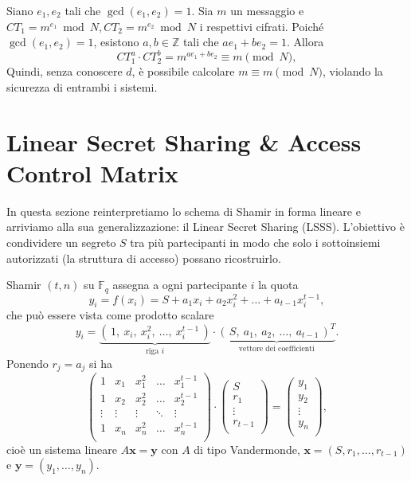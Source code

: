 \documentclass[a4paper, 11pt]{article}
\begin{document}
Siano $e_1,e_2$ tali che $\gcd(e_1,e_2)=1$. Sia $m$ un messaggio e $CT_1 = m^{e_1}\bmod N,CT_2 = m^{e_2}\bmod N$ i respettivi cifrati. Poiché $\gcd(e_1,e_2)=1$, esistono $a,b\in\mathbb{Z}$ tali che $ae_1 + be_2 = 1$. Allora
\[
    CT_1^a \cdot CT_2^b = m^{ae_1 + be_2} \equiv m \pmod N,
\] 
Quindi, senza conoscere $d$, è possibile calcolare $m \equiv m \pmod N$, violando la sicurezza di entrambi i sistemi.

\newpage

\section{Linear Secret Sharing \& Access Control Matrix}

In questa sezione reinterpretiamo lo schema di Shamir in forma lineare e arriviamo alla sua generalizzazione: il Linear Secret Sharing (LSSS). L'obiettivo è condividere un segreto $S$ tra più partecipanti in modo che solo i sottoinsiemi autorizzati (la struttura di accesso) possano ricostruirlo.

Shamir $(t,n)$ su $\mathbb{F}_q$ assegna a ogni partecipante $i$ la quota
\[
    y_i=f(x_i)=S + a_1 x_i + a_2 x_i^2 + \dots + a_{t-1} x_i^{t-1},
\]
che può essere vista come prodotto scalare
\[
    y_i=\underbrace{(\,1,\ x_i,\ x_i^2,\ \dots,\ x_i^{t-1}\,)}_{\text{riga }i}
    \cdot
    \underbrace{(\,S,\ a_1,\ a_2,\ \dots,\ a_{t-1}\,)^T}_{\text{vettore dei coefficienti}}.
\]
Ponendo $r_j=a_j$ si ha
\[
\begin{pmatrix}
1 & x_1 & x_1^2 & \dots & x_1^{t-1} \\
1 & x_2 & x_2^2 & \dots & x_2^{t-1} \\
\vdots & \vdots & \vdots & \ddots & \vdots \\   
1 & x_n & x_n^2 & \dots & x_n^{t-1} \\
\end{pmatrix}
\cdot
\begin{pmatrix}
S \\
r_1 \\
\vdots \\   
r_{t-1} \\
\end{pmatrix}
=
\begin{pmatrix}
y_1 \\
y_2 \\
\vdots \\   
y_n \\
\end{pmatrix},
\]
cioè un sistema lineare $A\mathbf{x}=\mathbf{y}$ con $A$ di tipo Vandermonde, $\mathbf{x}=(S,r_1,\dots,r_{t-1})$ e $\mathbf{y}=(y_1,\dots,y_n)$.
\end{document}
